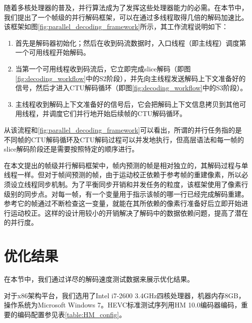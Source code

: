 随着多核处理器的普及，并行算法成为了发挥这些处理器能力的必需。在本节中，我们提出了一个帧级的并行解码框架，可以在通过多线程取得几倍的解码加速比。该框架如图\ref{fig:parallel_decoding_framework}所示，其工作流程说明如下：
\begin{enumerate}
	\item 首先是解码器初始化；然后在收到码流数据时，入口线程（即主线程）调度第一个可用线程开始解码。
	\item 当第一个可用线程收到码流后，它立即完成slice解码（即图\ref{fig:decoding_workflow}中的S2阶段），并先向主线程发送解码上下文准备好的信号，然后才进入CTU解码循环（即图\ref{fig:decoding_workflow}中的S3阶段）。
	\item 主线程收到解码上下文准备好的信号后，它会把解码上下文信息拷贝到其他可用线程，并调度它们并行地开始后续帧的CTU解码循环。
\end{enumerate}

从该流程和\ref{fig:parallel_decoding_framework}可以看出，所谓的并行任务指的是不同帧的CTU解码循环及CTU解码过程可以并发地执行，但高层语法和每一帧的slice解码阶段还是需要按照特定的顺序进行。

在本文提出的帧级并行解码框架中，帧内预测的帧是相对独立的，其解码过程与单线程一样。但对于帧间预测的帧，由于运动校正依赖于参考帧的重建像素，所以必须设立线程同步机制。为了平衡同步开销和并发任务的粒度，该框架使用了像素行级别的同步点。对每一帧，有一个变量用于指示该帧的哪一行已经完成解码重建。参考它的帧通过不断检查这一变量，就能在其所依赖的像素行准备好后立即开始进行运动校正。这样的设计用较小的开销解决了解码中的数据依赖问题，提高了潜在的并行度。

\section{优化结果}

在本节中，我们通过详尽的解码速度测试数据来展示优化结果。

对于x86架构平台，我们选用了Intel i7-2600 3.4GHz四核处理器，机器内存8GB，操作系统为Microsoft Windows 7。HEVC标准测试序列用HM 10.0编码器编码，重要的编码配置参见表\ref{table:HM_config}。

